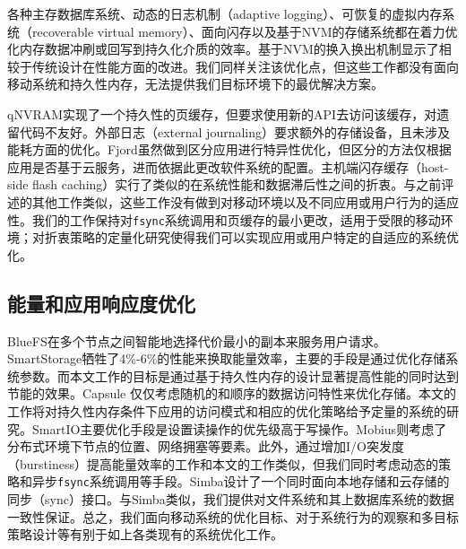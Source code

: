 各种主存数据库系统\cite{DeBrabant:2013:ANA:2556549.2556575,DeWitt:1984:ITM:602259.602261,
Kallman:2008:HHD:1454159.1454211, Ongaro:2011:FCR:2043556.2043560}、动态的日志机制（adaptive logging）\cite{Kim:2010:ALM:1920841.1921023}、可恢复的虚拟内存系统（recoverable virtual memory）\cite{Satyanarayanan:1993:LRV:168619.168631}、面向闪存\cite{Dai:2004:EEL:1031495.1031516,
Kim:2012:GBC:2254756.2254786, Lv:2011:OBM:1989323.1989326}以及基于NVM\cite{Coburn:2013:AMT:2517349.2522724, hitz1994file, 6880383, Wu:1994:ENM:195473.195506}的存储系统都在着力优化内存数据冲刷或回写到持久化介质的效率。基于NVM的换入换出机制\cite{6986137}显示了相较于传统设计在性能方面的改进。我们同样关注该优化点，但这些工作都没有面向移动系统和持久性内存，无法提供我们目标环境下的最优解决方案。

qNVRAM\cite{183627}实现了一个持久性的页缓存，但要求使用新的API去访问该缓存，对遗留代码不友好。外部日志（external journaling）\cite{Jeong:2013:ISO:2535461.2535499}要求额外的存储设备，且未涉及能耗方面的优化。Fjord\cite{6558430}虽然做到区分应用进行特异性优化，但区分的方法仅根据应用是否基于云服务，进而依据此更改软件系统的配置。主机端闪存缓存（host-side flash caching）\cite{koller2013write}实行了类似的在系统性能和数据滞后性之间的折衷。与之前评述的其他工作类似，这些工作没有做到对移动环境以及不同应用或用户行为的适应性。我们的工作保持对\texttt{fsync}系统调用和页缓存的最小更改，适用于受限的移动环境；对折衷策略的定量化研究使得我们可以实现应用或用户特定的自适应的系统优化。

\subsection{能量和应用响应度优化}
BlueFS\cite{Nightingale:2004:ESF:1251254.1251279}在多个节点之间智能地选择代价最小的副本来服务用户请求。SmartStorage\cite{Nguyen:2013:SSE:2493432.2493505}牺牲了4\%-6\%的性能来换取能量效率，主要的手段是通过优化存储系统参数。而本文工作的目标是通过基于持久性内存的设计显著提高性能的同时达到节能的效果。Capsule\cite{Mathur:2006:CEO:1182807.1182827} 仅仅考虑随机的和顺序的数据访问特性来优化存储。本文的工作将对持久性内存条件下应用的访问模式和相应的优化策略给予定量的系统的研究。SmartIO\cite{Nguyen:2014:ISR:2638728.2638841}主要优化手段是设置读操作的优先级高于写操作。Mobius\cite{Chun:2012:MUM:2307636.2307650}则考虑了分布式环境下节点的位置、网络拥塞等要素。此外，通过增加I/O突发度（burstiness）提高能量效率的工作\cite{Papa:2003:EET, Weissel:2002:CIN:844128.844140}和本文的工作类似，但我们同时考虑动态的策略和异步\texttt{fsync}系统调用等手段。Simba\cite{188466}设计了一个同时面向本地存储和云存储的同步（sync）接口。与Simba类似，我们提供对文件系统和其上数据库系统的数据一致性保证。总之，我们面向移动系统的优化目标、对于系统行为的观察和多目标策略设计等有别于如上各类现有的系统优化工作。

